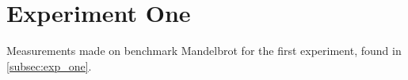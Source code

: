\section{Experiment One}\label{app:exp_one}

Measurements made on benchmark Mandelbrot for the first experiment, found in \cref{subsec:exp_one}.

% 
% 







